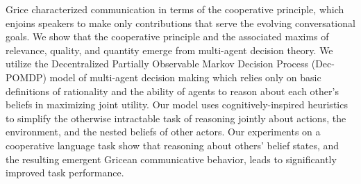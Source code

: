 Grice characterized communication in terms of the cooperative principle, which enjoins speakers to make only contributions that serve the evolving
 conversational goals.  We show that the cooperative principle and the
 associated maxims of relevance, quality, and quantity emerge from multi-agent
 decision theory.  We utilize the Decentralized Partially Observable Markov
 Decision Process (Dec-POMDP) model of multi-agent decision making which relies
 only on basic definitions of rationality and the ability of agents to reason
 about each other's beliefs in maximizing joint utility.  Our model uses
 cognitively-inspired heuristics to simplify the otherwise intractable task of
 reasoning jointly about actions, the environment, and the nested beliefs of
 other actors.  Our experiments on a cooperative language task show that
 reasoning about others' belief states, and the resulting emergent Gricean
 communicative behavior, leads to significantly improved task performance.

